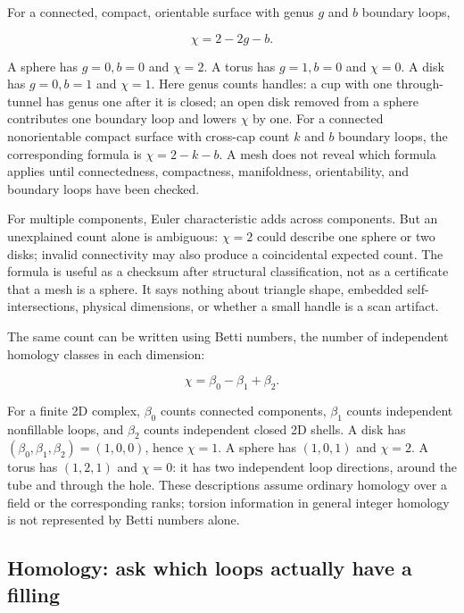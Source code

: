 For a connected, compact, orientable surface with genus \(g\) and \(b\) boundary loops,

\[
\chi=2-2g-b.
\]

A sphere has \(g=0,b=0\) and \(\chi=2\). A torus has \(g=1,b=0\) and \(\chi=0\). A disk has \(g=0,b=1\) and \(\chi=1\). Here genus counts handles: a cup with one through-tunnel has genus one after it is closed; an open disk removed from a sphere contributes one boundary loop and lowers \(\chi\) by one. For a connected nonorientable compact surface with cross-cap count \(k\) and \(b\) boundary loops, the corresponding formula is \(\chi=2-k-b\). A mesh does not reveal which formula applies until connectedness, compactness, manifoldness, orientability, and boundary loops have been checked.

For multiple components, Euler characteristic adds across components. But an unexplained count alone is ambiguous: \(\chi=2\) could describe one sphere or two disks; invalid connectivity may also produce a coincidental expected count. The formula is useful as a checksum after structural classification, not as a certificate that a mesh is a sphere. It says nothing about triangle shape, embedded self-intersections, physical dimensions, or whether a small handle is a scan artifact.

The same count can be written using Betti numbers, the number of independent homology classes in each dimension:

\[
\chi=\beta_0-\beta_1+\beta_2.
\]

For a finite 2D complex, \(\beta_0\) counts connected components, \(\beta_1\) counts independent nonfillable loops, and \(\beta_2\) counts independent closed 2D shells. A disk has \((\beta_0,\beta_1,\beta_2)=(1,0,0)\), hence \(\chi=1\). A sphere has \((1,0,1)\) and \(\chi=2\). A torus has \((1,2,1)\) and \(\chi=0\): it has two independent loop directions, around the tube and through the hole. These descriptions assume ordinary homology over a field or the corresponding ranks; torsion information in general integer homology is not represented by Betti numbers alone.


\subsection{Homology: ask which loops actually have a filling}\label{03-visual-computing-i-ch002-homology-ask-which-loops-actually-have-a-filling}


